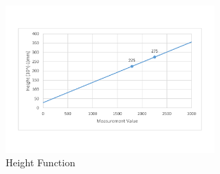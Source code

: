 \begin{figure}[H]
	\begin{center}
		\includegraphics[width=0.7\textwidth]{media/Measurements_Height_Sensor.pdf} 	
		\caption{Height Function}
		\label{fig:heightfunction}
	\end{center}
\end{figure}
